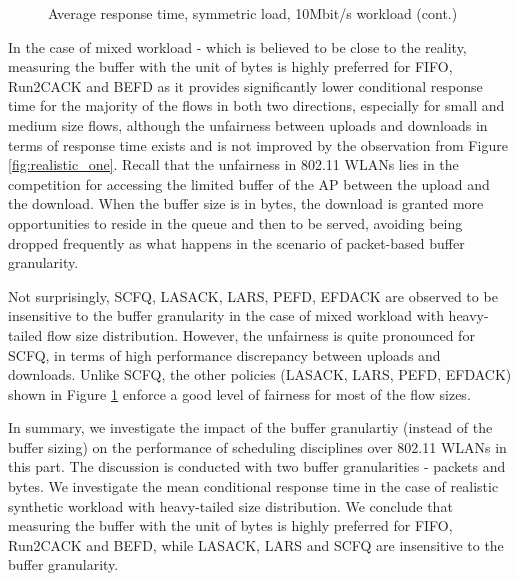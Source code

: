 \documentclass[preprint,12pt]{elsarticle}
\begin{document}
\begin{figure}[ht!]
  \caption{Average response time, symmetric load, 10Mbit/s workload (cont.)}
  \label{fig:realistic_two}
\end{figure}

In the case of mixed workload - which is believed to be close to the reality, measuring the buffer with the unit of bytes is highly preferred for FIFO, Run2CACK and BEFD as it provides significantly lower conditional response time for the majority of the flows in both two directions, especially for small and medium size flows, although the unfairness between uploads and downloads in terms of response time exists and is not improved by the observation from Figure \ref{fig:realistic_one}. Recall that the unfairness in 802.11 WLANs lies in the competition for accessing the limited buffer of the AP between the upload and the download. When the buffer size is in bytes, the download is granted more opportunities to reside in the queue and then to be served, avoiding being dropped frequently as what happens in the scenario of packet-based buffer granularity. 



Not surprisingly, SCFQ, LASACK, LARS, PEFD, EFDACK are observed to be insensitive to the buffer granularity in the case of mixed workload with heavy-tailed flow size distribution. However, the unfairness is quite pronounced for SCFQ, in terms of high performance discrepancy between uploads and downloads. Unlike SCFQ, the other policies (LASACK, LARS, PEFD, EFDACK) shown in Figure \ref{fig:realistic_two} enforce a good level of fairness for most of the flow sizes. 

In summary, we investigate the impact of the buffer granulartiy (instead of the buffer sizing) on the performance of scheduling disciplines over 802.11 WLANs in this part. The discussion is conducted with two buffer granularities - packets and bytes. We investigate the mean conditional response time in the case of realistic synthetic workload with heavy-tailed size distribution. We conclude that measuring the buffer with the unit of bytes is highly preferred for FIFO, Run2CACK and BEFD, while LASACK, LARS and SCFQ are insensitive to the buffer granularity. 
\end{document}
